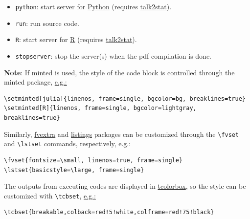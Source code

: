 \documentclass{ltxdoc}
\begin{document}
\begin{itemize}
\item \texttt{python}: start server for \href{https://www.python.org/}{Python}
(requires \href{https://pypi.org/project/talk2stat/}{talk2stat}).

\item \texttt{run}: run source code.

\item \texttt{R}: start server for \href{https://www.r-project.org/}{R} (requires
\href{https://pypi.org/project/talk2stat/}{talk2stat}).

\item \texttt{stopserver}: stop the server(s) when the pdf compilation is done.
\end{itemize}

\textbf{Note}: If \href{https://ctan.org/pkg/minted}{minted} is used, the style of
the code block is controlled through the minted package,
\href{https://github.com/Ossifragus/runcode/blob/master/examples/MontyHall/MontyHall.tex\#L3-L4}{e.g.:}

\begin{verbatim}
\setminted[julia]{linenos, frame=single, bgcolor=bg, breaklines=true}
\setminted[R]{linenos, frame=single, bgcolor=lightgray, breaklines=true}
\end{verbatim}

Similarly, \href{https://ctan.org/pkg/fvextra}{fvextra} and \href{https://ctan.org/pkg/listings?lang=en}{listings} packages can be customized through the \texttt{\textbackslash{}fvset}
and \texttt{\textbackslash{}lstset} commands, respectively, e.g.: 

\begin{verbatim}
\fvset{fontsize=\small, linenos=true, frame=single}
\lstset{basicstyle=\large, frame=single}
\end{verbatim}

The outputs from executing codes are displayed in
\href{https://ctan.org/pkg/tcolorbox?lang=en}{tcolorbox}, so the style can
be customized with \texttt{\textbackslash{}tcbset},
\href{https://github.com/Ossifragus/runcode/blob/master/examples/MontyHall/MontyHall.tex\#L5}{e.g.:}

\begin{verbatim}
\tcbset{breakable,colback=red!5!white,colframe=red!75!black}
\end{verbatim}
\end{document}
